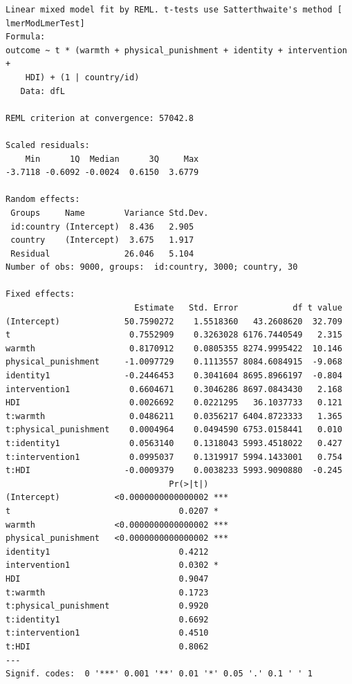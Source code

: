 \documentclass[
  letterpaper,
  DIV=11,
  numbers=noendperiod]{scrreprt}
\begin{document}
\begin{verbatim}
Linear mixed model fit by REML. t-tests use Satterthwaite's method [
lmerModLmerTest]
Formula: 
outcome ~ t * (warmth + physical_punishment + identity + intervention +  
    HDI) + (1 | country/id)
   Data: dfL

REML criterion at convergence: 57042.8

Scaled residuals: 
    Min      1Q  Median      3Q     Max 
-3.7118 -0.6092 -0.0024  0.6150  3.6779 

Random effects:
 Groups     Name        Variance Std.Dev.
 id:country (Intercept)  8.436   2.905   
 country    (Intercept)  3.675   1.917   
 Residual               26.046   5.104   
Number of obs: 9000, groups:  id:country, 3000; country, 30

Fixed effects:
                          Estimate   Std. Error           df t value
(Intercept)             50.7590272    1.5518360   43.2608620  32.709
t                        0.7552909    0.3263028 6176.7440549   2.315
warmth                   0.8170912    0.0805355 8274.9995422  10.146
physical_punishment     -1.0097729    0.1113557 8084.6084915  -9.068
identity1               -0.2446453    0.3041604 8695.8966197  -0.804
intervention1            0.6604671    0.3046286 8697.0843430   2.168
HDI                      0.0026692    0.0221295   36.1037733   0.121
t:warmth                 0.0486211    0.0356217 6404.8723333   1.365
t:physical_punishment    0.0004964    0.0494590 6753.0158441   0.010
t:identity1              0.0563140    0.1318043 5993.4518022   0.427
t:intervention1          0.0995037    0.1319917 5994.1433001   0.754
t:HDI                   -0.0009379    0.0038233 5993.9090880  -0.245
                                 Pr(>|t|)    
(Intercept)           <0.0000000000000002 ***
t                                  0.0207 *  
warmth                <0.0000000000000002 ***
physical_punishment   <0.0000000000000002 ***
identity1                          0.4212    
intervention1                      0.0302 *  
HDI                                0.9047    
t:warmth                           0.1723    
t:physical_punishment              0.9920    
t:identity1                        0.6692    
t:intervention1                    0.4510    
t:HDI                              0.8062    
---
Signif. codes:  0 '***' 0.001 '**' 0.01 '*' 0.05 '.' 0.1 ' ' 1


\end{verbatim}
\end{document}
